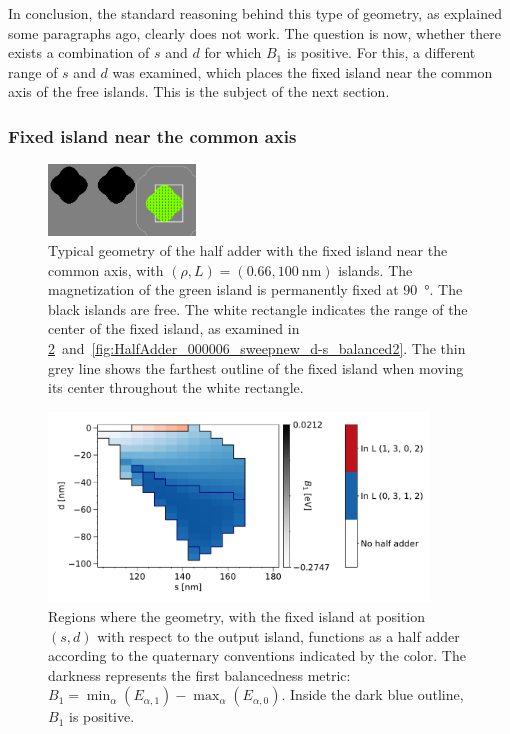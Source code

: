 \documentclass[11pt,a4paper,english]{article}
\begin{document}
In conclusion, the standard reasoning behind this type of geometry, as explained some paragraphs ago, clearly does not work. The question is now, whether there exists a combination of $s$ and $d$ for which $B_1$ is positive. For this, a different range of $s$ and $d$ was examined, which places the fixed island near the common axis of the free islands. This is the subject of the next section.


\subsubsection{Fixed island near the common axis}
\begin{figure}
    \centering
    \includegraphics[width=0.35\textwidth]{Figures/half_adder/regions000014.png} %
    \caption{Typical geometry of the half adder with the fixed island near the common axis, with $(\rho, L) = (0.66, \SI{100}{\nano\metre})$ islands. The magnetization of the green island is permanently fixed at \SI{90}{\degree}. The black islands are free. The white rectangle indicates the range of the center of the fixed island, as examined in \cref{fig:HalfAdder_000006_sweepnew_d-s_balanced1}~and~\ref{fig:HalfAdder_000006_sweepnew_d-s_balanced2}. The thin grey line shows the farthest outline of the fixed island when moving its center throughout the white rectangle.}
    \label{fig:HalfAdder_000006new_geometryTypical}
\end{figure}
\begin{figure}
    \centering
    \includegraphics[width=0.9\textwidth]{Figures/half_adder/sweep/000006_d-s/tableside(d0-100_5,s100-180_5)_balanced1.pdf}
    \caption{Regions where the geometry, with the fixed island at position $(s, d)$ with respect to the output island, functions as a half adder according to the quaternary conventions indicated by the color. The darkness represents the first balancedness metric: $B_1 = \min_\alpha(E_{\alpha,1}) - \max_\alpha(E_{\alpha,0})$. Inside the dark blue outline, $B_1$ is positive.} 
    \label{fig:HalfAdder_000006_sweepnew_d-s_balanced1}
\end{figure} %
\end{document}
